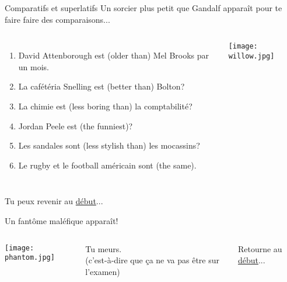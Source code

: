 \documentclass{beamer}
\begin{document}
  \begin{frame}{Comparatifs et superlatifs}
    \hypertarget{comparatifs}{}
    Un sorcier plus petit que Gandalf apparaît pour te faire faire des comparaisons...

    \vspace{0.25cm}
    \begin{columns}
        \scriptsize
        \begin{enumerate}
          \item David Attenborough est \underline{} (older than) Mel Brooks par un mois.
          \item La cafétéria Snelling est \underline{} (better than) Bolton?
          \item La chimie est \underline{} (less boring than) la comptabilité?
          \item Jordan Peele est \underline{} (the funniest)?
          \item Les sandales sont \underline{} (less stylish than) les mocassins?
          \item Le rugby et le football américain sont \underline{} (the same).
        \end{enumerate}

        \begin{center}
          \texttt{[image: willow.jpg]}
        \end{center}
    \end{columns}
    \vspace{0.25cm}
    Tu peux revenir au \hyperlink{début}{début}...
  \end{frame}

  \begin{frame}{}
    \hypertarget{mort}{}
    Un fantôme maléfique  apparaît!
    \begin{columns}
        \begin{center}
          \texttt{[image: phantom.jpg]}
        \end{center}
        \begin{center}
          \Large{Tu meurs.} \\
          (c'est-à-dire que ça ne va pas être sur l'examen) \\
        \end{center}

        \vspace{0.25cm}
        Retourne au \hyperlink{début}{début}...
    \end{columns}
  \end{frame}
\end{document}
